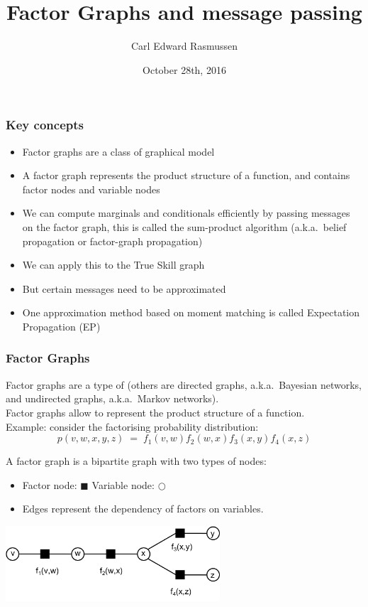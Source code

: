 

\title{Factor Graphs and message passing}
\author{Carl Edward Rasmussen}
\date{October 28th, 2016}




\begin{frame}
\titlepage
\end{frame}


\begin{frame}
\frametitle{Key concepts}

\begin{itemize}
\item Factor graphs are a class of graphical model
\item A factor graph represents the product structure of a function,
  and contains factor nodes and variable nodes 
\item We can compute marginals and conditionals efficiently by passing
  messages on the factor graph, this is called the sum-product
  algorithm (a.k.a.\  belief propagation or factor-graph propagation)
\item We can apply this to the True Skill graph
\item But certain messages need to be approximated
\item One approximation method based on moment matching is
  called Expectation Propagation (EP)
\end{itemize}

\end{frame}


\begin{frame}
\frametitle{Factor Graphs}

Factor graphs are a type of \emph{} (others are directed graphs, a.k.a.\ Bayesian networks,
and undirected graphs, a.k.a.\ Markov networks).\\[1ex]

Factor graphs allow to represent the product structure of a
function.\\[1ex]

Example: consider the factorising probability distribution:
\[
p(v, w, x, y, z)\;=\;f_1(v, w)f_2(w, x)f_3(x, y)f_4(x, z)
\]

A factor graph is a bipartite graph with two types of nodes:
\begin{itemize}
\item Factor node: $\blacksquare$ \;\;\;\; Variable node: $\bigcirc$
\item Edges represent the dependency of factors on variables.
\end{itemize}

\centerline{\includegraphics[width=0.6\textwidth]{ExampleFactorGraph1}}

\end{frame}

